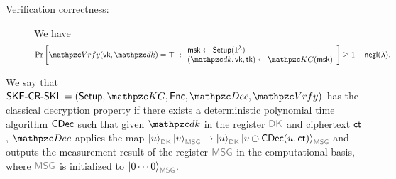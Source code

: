 \begin{definition}
\begin{description}
\item[Verification correctness:] We have 
\begin{align}
\Pr\left[
\qVrfy(\vk,\qdk)=\top
\ :
\begin{array}{ll}
\msk\gets\Setup(1^\secp)\\
(\qdk,\vk,\tk)\gets\qKG(\msk)\\
\end{array}
\right] 
\ge 1-\negl(\secp).
\end{align}


\end{description}
\end{definition}


\begin{definition}\label{def:CDEC_SKE-CR-SKL}
We say that $\SKECRSKL\allowbreak=(\Setup,\qKG,\Enc,\qDec,\qVrfy)$ has
the classical decryption property if there exists a deterministic
polynomial time algorithm $\mathsf{CDec}$ such that given $\qdk$ in the
register $\qreg{DK}$ and ciphertext $\mathsf{ct}$, $\qDec$ applies the map
$\ket{u}_{\qreg{DK}}\ket{v}_{\qreg{MSG}}\ra\ket{u}_{\qreg{DK}}\allowbreak\ket{v\oplus\CDec(u,\ct)}_{\qreg{MSG}}$
and outputs the measurement result of the register $\qreg{MSG}$ in
the computational basis, where $\qreg{MSG}$ is initialized to
$\ket{0\cdots0}_{\qreg{MSG}}$.  \end{definition}

